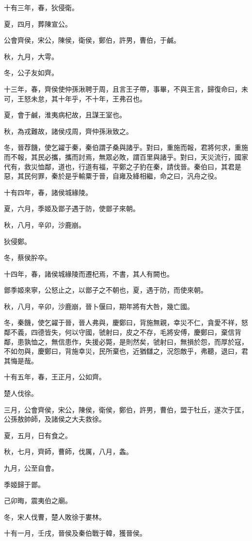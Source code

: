 \begin{pinyinscope}
十有三年，春，狄侵衛。

夏，四月，葬陳宣公。

公會齊侯，宋公，陳侯，衛侯，鄭伯，許男，曹伯，于鹹。

秋，九月，大雩。

冬，公子友如齊。

十三年，春，齊侯使仲孫湫聘于周，且言王子帶，事畢，不與王言，歸復命曰，未可，王怒未怠，其十年乎，不十年，王弗召也。

夏，會于鹹，淮夷病杞故，且謀王室也。

秋，為戎難故，諸侯戍周，齊仲孫湫致之。

冬，晉荐饑，使乞糴于秦，秦伯謂子桑與諸乎。對曰，重施而報，君將何求，重施而不報，其民必攜，攜而討焉，無眾必敗，謂百里與諸乎。對曰，天災流行，國家代有，救災恤鄰，道也，行道有福，平鄭之子豹在秦，請伐晉。秦伯曰，其君是惡，其民何罪，秦於是乎輸粟于晉，自雍及絳相繼，命之曰，汎舟之役。

十有四年，春，諸侯城緣陵。

夏，六月，季姬及鄫子遇于防，使鄫子來朝。

秋，八月，辛卯，沙鹿崩。

狄侵鄭。

冬，蔡侯肸卒。

十四年，春，諸侯城緣陵而遷杞焉，不書，其人有闕也。

鄫季姬來寧，公怒止之，以鄫子之不朝也，夏，遇于防，而使來朝。

秋，八月，辛卯，沙鹿崩，晉卜偃曰，期年將有大咎，幾亡國。

冬，秦饑，使乞糴于晉，晉人弗與，慶鄭曰，背施無親，幸災不仁，貪愛不祥，怒鄰不義，四德皆失，何以守國，虢射曰，皮之不存，毛將安傅，慶鄭曰，棄信背鄰，患孰恤之，無信患作，失援必斃，是則然矣，虢射曰，無損於怨，而厚於寇，不如勿與，慶鄭曰，背施幸災，民所棄也，近猶讎之，況怨敵乎，弗聽，退曰，君其悔是哉。

十有五年，春，王正月，公如齊。

楚人伐徐。

三月，公會齊侯，宋公，陳侯，衛侯，鄭伯，許男，曹伯，盟于牡丘，遂次于匡，公孫敖帥師，及諸侯之大夫救徐。

夏，五月，日有食之。

秋，七月，齊師，曹師，伐厲，八月，螽。

九月，公至自會。

季姬歸于鄫。

己卯晦，震夷伯之廟。

冬，宋人伐曹，楚人敗徐于婁林。

十有一月，壬戌，晉侯及秦伯戰于韓，獲晉侯。


\end{pinyinscope}
